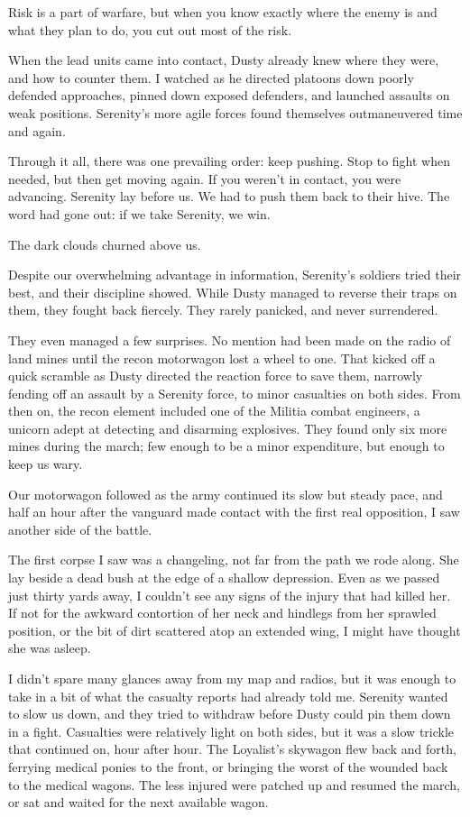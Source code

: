 Risk is a part of warfare, but when you know exactly where the enemy is and what they plan to do, you cut out most of the risk.

When the lead units came into contact, Dusty already knew where they were, and how to counter them. I watched as he directed platoons down poorly defended approaches, pinned down exposed defenders, and launched assaults on weak positions. Serenity’s more agile forces found themselves outmaneuvered time and again.

Through it all, there was one prevailing order: keep pushing. Stop to fight when needed, but then get moving again. If you weren’t in contact, you were advancing. Serenity lay before us. We had to push them back to their hive. The word had gone out: if we take Serenity, we win.

The dark clouds churned above us.

Despite our overwhelming advantage in information, Serenity’s soldiers tried their best, and their discipline showed. While Dusty managed to reverse their traps on them, they fought back fiercely. They rarely panicked, and never surrendered.

They even managed a few surprises. No mention had been made on the radio of land mines until the recon motorwagon lost a wheel to one. That kicked off a quick scramble as Dusty directed the reaction force to save them, narrowly fending off an assault by a Serenity force, to minor casualties on both sides. From then on, the recon element included one of the Militia combat engineers, a unicorn adept at detecting and disarming explosives. They found only six more mines during the march; few enough to be a minor expenditure, but enough to keep us wary.

Our motorwagon followed as the army continued its slow but steady pace, and half an hour after the vanguard made contact with the first real opposition, I saw another side of the battle.

The first corpse I saw was a changeling, not far from the path we rode along. She lay beside a dead bush at the edge of a shallow depression. Even as we passed just thirty yards away, I couldn’t see any signs of the injury that had killed her. If not for the awkward contortion of her neck and hindlegs from her sprawled position, or the bit of dirt scattered atop an extended wing, I might have thought she was asleep.

I didn’t spare many glances away from my map and radios, but it was enough to take in a bit of what the casualty reports had already told me. Serenity wanted to slow us down, and they tried to withdraw before Dusty could pin them down in a fight. Casualties were relatively light on both sides, but it was a slow trickle that continued on, hour after hour. The Loyalist’s skywagon flew back and forth, ferrying medical ponies to the front, or bringing the worst of the wounded back to the medical wagons. The less injured were patched up and resumed the march, or sat and waited for the next available wagon.

